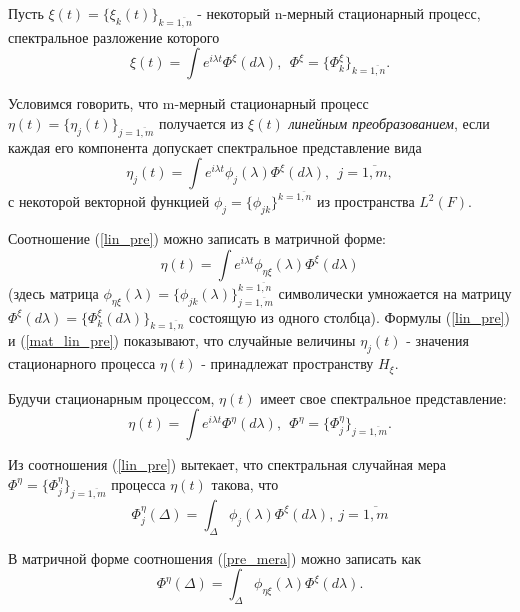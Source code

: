  Пусть $\xi(t)=\{\xi_k(t)\}_{k=\overline{1,n}}$ - некоторый n-мерный стационарный процесс, спектральное разложение которого 
\begin{equation} 
	\xi(t)=\int e^{i \lambda t} \Phi^\xi(d \lambda), \ \ \Phi^\xi = \{\Phi^\xi_k\}_{k=\overline{1,n}}.
 \end{equation}

 Условимся говорить, что m-мерный стационарный процесс $\eta(t) = \{\eta_j(t)\}_{j=\overline{1,m}}$ получается из $\xi(t)$ \emph{линейным преобразованием}, если каждая его компонента допускает спектральное представление вида 
\begin{equation} 
	\label{lin_pre} \eta_j(t) = \int e^{i \lambda t} \phi_j(\lambda) \Phi^\xi(d \lambda), \ \ j = \overline{1,m}, 
\end{equation} 
с некоторой векторной функцией $\phi_j = \{\phi_{jk}\}^{k=\overline{1,n}}$ из пространства $L^2(F)$.

 Соотношение (\ref{lin_pre}) можно записать в матричной форме: 
\begin{equation} 
	\label{mat_lin_pre} \eta(t) = \int e^{i \lambda t} \phi_{\eta \xi}(\lambda) \Phi^\xi(d \lambda)
\end{equation} 
(здесь матрица $\phi_{\eta \xi}(\lambda) = \{\phi_{jk}(\lambda)\}^{k=\overline{1,n}}_{j=\overline{1,m}}$ символически умножается на матрицу $\Phi^\xi(d \lambda) = \{\Phi^\xi_k(d \lambda)\}_{k=\overline{1,n}}$ состоящую из одного столбца). Формулы (\ref{lin_pre}) и (\ref{mat_lin_pre}) показывают, что случайные величины $\eta_j(t)$ - значения стационарного процесса $\eta(t)$ - принадлежат пространству $H_\xi$.

 Будучи стационарным процессом, $\eta(t)$ имеет свое спектральное представление: 
\begin{equation} 
	\eta(t) = \int e^{i \lambda t} \Phi^\eta(d \lambda), \ \  \Phi^\eta = \{\Phi^\eta_j\}_{j=\overline{1,m}}. 
\end{equation}

 Из соотношения (\ref{lin_pre}) вытекает, что спектральная случайная мера $\Phi^\eta = \{\Phi^\eta_j\}_{j=\overline{1,m}}$ процесса $\eta(t)$ такова, что 
\begin{equation} 
	\label{pre_mera} \Phi^\eta_j(\Delta) = \int_{\Delta} \phi_j(\lambda) \Phi^\xi(d \lambda), \ j=\overline{1,m}
 \end{equation}

 В матричной форме соотношения (\ref{pre_mera}) можно записать как 
\begin{equation} 
	\label{mat_pre_mera} \Phi^\eta(\Delta) = \int_{\Delta} \phi_{\eta\xi}(\lambda) \Phi^\xi(d \lambda). 
\end{equation}

